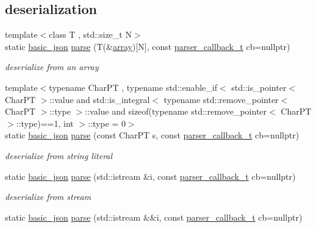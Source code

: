 \subsection*{deserialization}
\begin{DoxyCompactItemize}
\item 
{\footnotesize template$<$class T , std\+::size\+\_\+t N$>$ }\\static \hyperlink{classnlohmann_1_1basic__json}{basic\+\_\+json} \hyperlink{classnlohmann_1_1basic__json_ace63ac4eb1dd7251a259d32e397461a3}{parse} (T(\&\hyperlink{classnlohmann_1_1basic__json_a5685815624b086caa532f41e853d4b0f}{array})\mbox{[}N\mbox{]}, const \hyperlink{classnlohmann_1_1basic__json_a9e35475e2027520a78e09f460dbe048a}{parser\+\_\+callback\+\_\+t} cb=nullptr)
\begin{DoxyCompactList}\small\item\em deserialize from an array \end{DoxyCompactList}\item 
{\footnotesize template$<$typename Char\+PT , typename std\+::enable\+\_\+if$<$ std\+::is\+\_\+pointer$<$ Char\+P\+T $>$\+::value and std\+::is\+\_\+integral$<$ typename std\+::remove\+\_\+pointer$<$ Char\+P\+T $>$\+::type $>$\+::value and sizeof(typename std\+::remove\+\_\+pointer$<$ Char\+P\+T $>$\+::type)==1, int $>$\+::type  = 0$>$ }\\static \hyperlink{classnlohmann_1_1basic__json}{basic\+\_\+json} \hyperlink{classnlohmann_1_1basic__json_a90f05d55d9d0702c075cd281fd0d85ae}{parse} (const Char\+PT s, const \hyperlink{classnlohmann_1_1basic__json_a9e35475e2027520a78e09f460dbe048a}{parser\+\_\+callback\+\_\+t} cb=nullptr)
\begin{DoxyCompactList}\small\item\em deserialize from string literal \end{DoxyCompactList}\item 
static \hyperlink{classnlohmann_1_1basic__json}{basic\+\_\+json} \hyperlink{classnlohmann_1_1basic__json_a0923f9749409345a21f8cb15ee95fc0d}{parse} (std\+::istream \&i, const \hyperlink{classnlohmann_1_1basic__json_a9e35475e2027520a78e09f460dbe048a}{parser\+\_\+callback\+\_\+t} cb=nullptr)
\begin{DoxyCompactList}\small\item\em deserialize from stream \end{DoxyCompactList}\item 
static \hyperlink{classnlohmann_1_1basic__json}{basic\+\_\+json} \hyperlink{classnlohmann_1_1basic__json_a959bc32fc72a76cd5a1bd6977926f787}{parse} (std\+::istream \&\&i, const \hyperlink{classnlohmann_1_1basic__json_a9e35475e2027520a78e09f460dbe048a}{parser\+\_\+callback\+\_\+t} cb=nullptr)

\end{DoxyCompactItemize}
